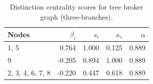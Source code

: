 \begin{table}
\centering
\caption{\label{tab:tree3}Distinction centrality scores for tree broker graph (three-branches).}
\centering
\begin{tabular}[t]{lrrrr}
\toprule
Nodes & $\beta_i$ & $s_i$ & $\kappa_i$ & $\alpha$\\
\midrule
1, 5 & 0.764 & 1.000 & 0.125 & 0.889\\
9 & -0.205 & 0.894 & 1.000 & 0.889\\
2, 3, 4, 6, 7, 8 & -0.220 & 0.447 & 0.618 & 0.889\\
\bottomrule
\end{tabular}
\end{table}

